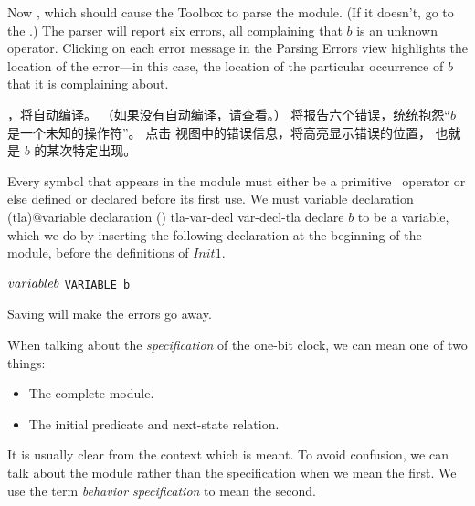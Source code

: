 \begin{en}
Now , which should cause the
Toolbox to parse the module.  (If it doesn't, go to the
.)  The
parser will report six errors, all complaining that $b$ is an unknown
operator.  Clicking on each error message in the \textsf{Parsing
Errors} view highlights the location of the error---in this case, the
location of the particular occurrence of $b$ that it is complaining
about.
\end{en}

\begin{ch}
  ，\tlatoolbox{}将自动编译。
  （如果\tlatoolbox{}没有自动编译，请查看。）
  \tlaparser{}将报告六个错误，统统抱怨``$b$是一个未知的操作符''。
  点击 \textsf{\tlaparsererror} 视图中的错误信息，将高亮显示错误的位置，
  也就是 $b$ 的某次特定出现。
\end{ch}

Every symbol that appears in the module must either be a
primitive \tlaplus\ operator or else defined or declared before its
first use.  We must 
   {variable declaration (tla)@variable declaration ()}%
   {tla-var-decl}%
   {var-decl-tla}%
declare $b$ to be a variable, which we do by
inserting the following declaration at the beginning of the module,
before the definitions of $Init1$.%
\begin{display}
\begin{twocols}
$\VARIABLE b$ %
\midcol \verb|VARIABLE b|
\end{twocols}
\end{display}
Saving 
will make the errors go away.

\pause
%
\noindent
%
When talking about the 
\emph{specification} of the one-bit clock, we
can mean one of two things:
\begin{itemize}
\item The complete module.  

\item The initial predicate and next-state relation.
\end{itemize}
It is usually clear from the context which is meant.  To avoid
confusion, we can talk about the module rather than the specification
when we mean the first.  We use the term
\emph{behavior specification} to mean the second.

